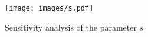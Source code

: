 \begin{figure}[!ht]
\centering
\texttt{[image: images/s.pdf]}
\caption{\small Sensitivity analysis of the parameter $s$}
\label{fig:s}
\end{figure}